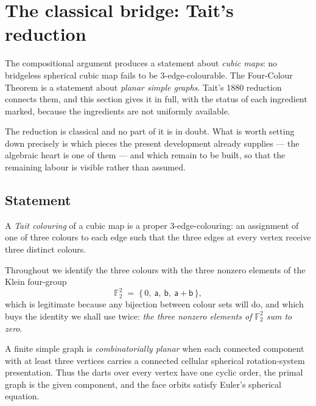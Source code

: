 %

\section{The classical bridge: Tait's reduction}
\label{sec:tait-reduction}

The compositional argument produces a statement about \emph{cubic maps}: no
bridgeless spherical cubic map fails to be $3$-edge-colourable. The
Four-Colour Theorem is a statement about \emph{planar simple graphs}. Tait's
1880 reduction connects them, and this section gives it in full, with the
status of each ingredient marked, because the ingredients are not uniformly
available.

The reduction is classical and no part of it is in doubt. What is worth
setting down precisely is which pieces the present development already
supplies --- the algebraic heart is one of them --- and which remain to be
built, so that the remaining labour is visible rather than assumed.

\subsection{Statement}

\begin{definition}\label{def:tait}
A \emph{Tait colouring} of a cubic map is a proper $3$-edge-colouring: an
assignment of one of three colours to each edge such that the three edges at
every vertex receive three distinct colours.
\end{definition}

Throughout we identify the three colours with the three nonzero elements of
the Klein four-group
\[
  \mathbb{F}_2^2 \;=\; \{\,0,\ \mathsf a,\ \mathsf b,\ \mathsf a + \mathsf b\,\},
\]
which is legitimate because any bijection between colour sets will do, and
which buys the identity we shall use twice: \emph{the three nonzero elements
of $\mathbb{F}_2^2$ sum to zero}.

\begin{definition}
\label{def:combinatorial-planarity}
A finite simple graph is \emph{combinatorially planar} when each connected
component with at least three vertices carries a connected cellular spherical
rotation-system presentation.  Thus the darts over every vertex have one
cyclic order, the primal graph is the given component, and the face orbits
satisfy Euler's spherical equation.
\end{definition}

